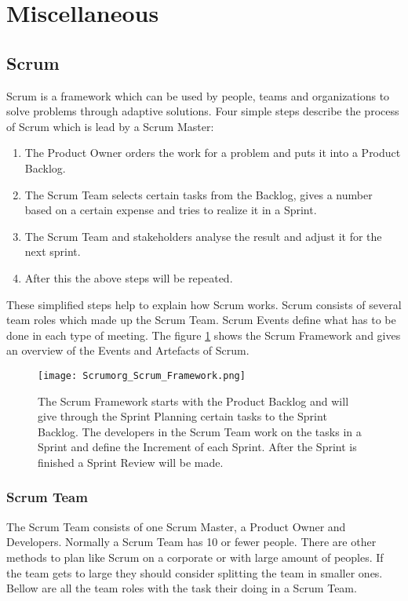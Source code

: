 \section{Miscellaneous}


\subsection{Scrum} \label{sec:Scrum}
Scrum is a framework which can be used by people, teams and organizations to solve problems through adaptive solutions. Four simple steps describe the process of Scrum which is lead by a Scrum Master:
\begin{enumerate}
    \item The Product Owner orders the work for a problem and puts it into a Product Backlog.
    \item The Scrum Team selects certain tasks from the Backlog, gives a number based on a certain expense and tries to realize it in a Sprint.
    \item The Scrum Team and stakeholders analyse the result and adjust it for the next sprint.
    \item After this the above steps will be repeated.
\end{enumerate}

These simplified steps help to explain how Scrum works. Scrum consists of several team roles which made up the Scrum Team. Scrum Events define what has to be done in each type of meeting. The figure \ref{fig:Scrum Framework} shows the Scrum Framework and gives an overview of the Events and Artefacts of Scrum. \cite{scrum_guide}


\begin{figure}[H]
    \centering
    \texttt{[image: Scrumorg\_Scrum\_Framework.png]}
    \caption{The Scrum Framework starts with the Product Backlog and will give through the Sprint Planning certain tasks to the Sprint Backlog. The developers in the Scrum Team work on the tasks in a Sprint and define the Increment of each Sprint. After the Sprint is finished a Sprint Review will be made. \cite{scrum_guide}}
    \label{fig:Scrum Framework}
\end{figure}


\subsubsection{Scrum Team} \label{sec:Scrum Team}
The Scrum Team consists of one Scrum Master, a Product Owner and Developers. Normally a Scrum Team has 10 or fewer people. There are other methods to plan like Scrum on a corporate or with large amount of peoples. If the team gets to large they should consider splitting the team in smaller ones. Bellow are all the team roles with the task their doing in a Scrum Team. \cite{scrum_guide}

